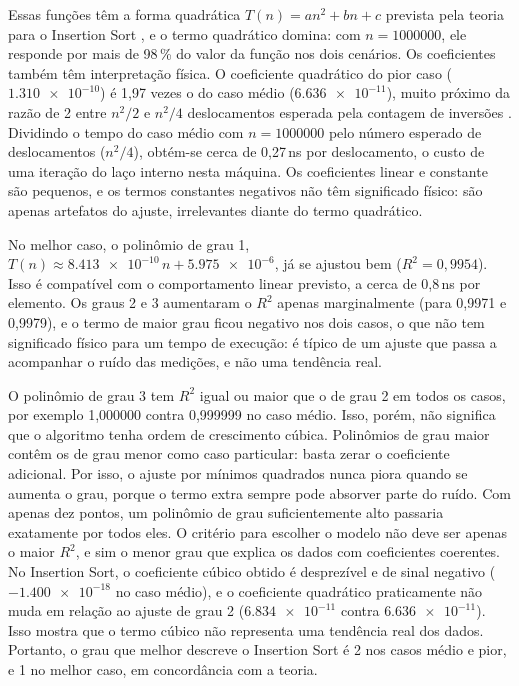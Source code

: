 \documentclass[
    12pt,
    oneside,
    a4paper,
    openany,
    chapter=TITLE,
    english,
    brazil
]{abntex2}
\begin{document}
Essas funções têm a forma quadrática $T(n) = a n^2 + b n + c$ prevista pela teoria para o Insertion Sort \cite{cormen2012}, e o termo quadrático domina: com $n = \num{1000000}$, ele responde por mais de 98\,\% do valor da função nos dois cenários. Os coeficientes também têm interpretação física. O coeficiente quadrático do pior caso ($\num{1.310e-10}$) é 1,97 vezes o do caso médio ($\num{6.636e-11}$), muito próximo da razão de 2 entre $n^2/2$ e $n^2/4$ deslocamentos esperada pela contagem de inversões \cite{knuth1998}. Dividindo o tempo do caso médio com $n = \num{1000000}$ pelo número esperado de deslocamentos ($n^2/4$), obtém-se cerca de 0,27\,ns por deslocamento, o custo de uma iteração do laço interno nesta máquina. Os coeficientes linear e constante são pequenos, e os termos constantes negativos não têm significado físico: são apenas artefatos do ajuste, irrelevantes diante do termo quadrático.

No melhor caso, o polinômio de grau 1, $T(n) \approx \num{8.413e-10}\, n + \num{5.975e-6}$, já se ajustou bem ($R^2 = 0{,}9954$). Isso é compatível com o comportamento linear previsto, a cerca de 0,8\,ns por elemento. Os graus 2 e 3 aumentaram o $R^2$ apenas marginalmente (para 0,9971 e 0,9979), e o termo de maior grau ficou negativo nos dois casos, o que não tem significado físico para um tempo de execução: é típico de um ajuste que passa a acompanhar o ruído das medições, e não uma tendência real.

O polinômio de grau 3 tem $R^2$ igual ou maior que o de grau 2 em todos os casos, por exemplo 1,000000 contra 0,999999 no caso médio. Isso, porém, não significa que o algoritmo tenha ordem de crescimento cúbica. Polinômios de grau maior contêm os de grau menor como caso particular: basta zerar o coeficiente adicional. Por isso, o ajuste por mínimos quadrados nunca piora quando se aumenta o grau, porque o termo extra sempre pode absorver parte do ruído. Com apenas dez pontos, um polinômio de grau suficientemente alto passaria exatamente por todos eles. O critério para escolher o modelo não deve ser apenas o maior $R^2$, e sim o menor grau que explica os dados com coeficientes coerentes. No Insertion Sort, o coeficiente cúbico obtido é desprezível e de sinal negativo ($-\num{1.400e-18}$ no caso médio), e o coeficiente quadrático praticamente não muda em relação ao ajuste de grau 2 ($\num{6.834e-11}$ contra $\num{6.636e-11}$). Isso mostra que o termo cúbico não representa uma tendência real dos dados. Portanto, o grau que melhor descreve o Insertion Sort é 2 nos casos médio e pior, e 1 no melhor caso, em concordância com a teoria.
\end{document}

